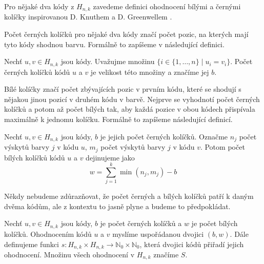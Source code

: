 Pro nějaké dva kódy z $H_{n,k}$ zavedeme definici ohodnocení bílými a černými kolíčky inspirovanou D. Knuthem \cite{donald_e__knuth_1977} a D. Greenwellem \cite{greenwell}. 

Počet černých kolíčků pro nějaké dva kódy značí počet pozic, na kterých mají tyto kódy shodnou barvu. Formálně to zapíšeme v následující definici.

\begin{definice}\label{def01:2}
  Nechť $u,v \in H_{n,k}$ jsou kódy. Uvažujme množinu $\{i \in \{1,\dots, n\}\mid  u_i = v_i \}$. Počet černých kolíčků kódů $u$ a $v$ je velikost této množiny a značíme jej $b$. 
\end{definice}


Bílé kolíčky značí počet zbývajících pozic v prvním kódu, které se shodují s nějakou jinou pozicí v druhém kódu v barvě. Nejprve se vyhodnotí počet černých kolíčků a potom až počet bílých tak, aby každá pozice v obou kódech přispívala maximálně k jednomu kolíčku. Formálně to zapíšeme následující definicí. 

\begin{definice}\label{defbilekol}
  Nechť $u,v \in H_{n,k}$ jsou kódy, $b$ je jejich počet černých kolíčků. 
  Označme $n_j$ počet výskytů barvy $j$ v kódu $u$, $m_j$ počet výskytů barvy $j$ v kódu $v$. 
  Potom počet bílých kolíčků kódů $u$ a $v$ dejinujeme jako 
  \[w = \sum_{j = 1}^k  \min(n_j, m_j) - b\]
\end{definice}

Někdy nebudeme zdůrazňovat, že počet černých a bílých kolíčků patří k daným dvěma kódům, ale z kontextu to jasně plyne a budeme to předpokládat. 

\begin{definice}[Ohodnocení]\label{ohodnoceni}
  Nechť $u,v \in H_{n,k}$ jsou kódy, $b$ je počet černých kolíčků a $w$ je počet bílých kolíčků. 
  Ohodnocením kódů $u$ a $v$ myslíme uspořádanou dvojici $(b,w)$.
  Dále definujeme funkci $s \colon H_{n,k} \times H_{n,k} \to \mathbb{N}_0\times \mathbb{N}_0$, která dvojici kódů přiřadí jejich ohodnocení. Množinu všech ohodnocení v $H_{n,k}$ značíme $S$.
\end{definice}

